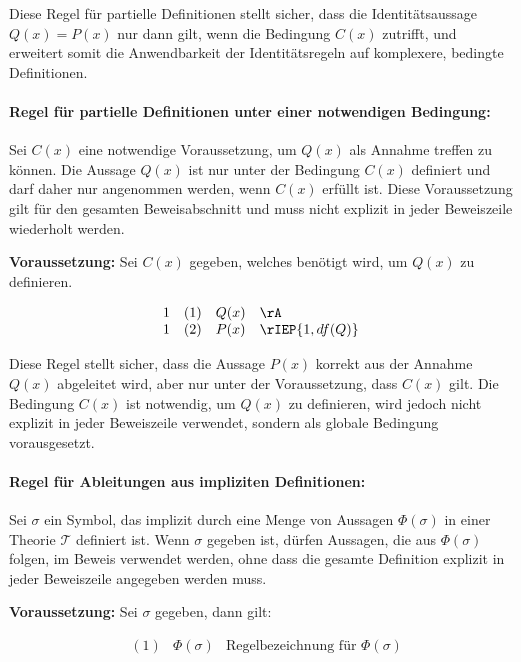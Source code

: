 \documentclass{book}
\theoremstyle{plain}
\theoremstyle{remark}
\theoremstyle{definition}
\begin{document}
Diese Regel für partielle Definitionen stellt sicher, dass die Identitätsaussage \(Q(x) = P(x)\) nur dann gilt, wenn die Bedingung \(C(x)\) zutrifft, und erweitert somit die Anwendbarkeit der Identitätsregeln auf komplexere, bedingte Definitionen.

\paragraph{Regel für partielle Definitionen unter einer notwendigen Bedingung:}
\label{rule:IEP}
Sei \(C(x)\) eine notwendige Voraussetzung, um \(Q(x)\) als Annahme treffen zu können. Die Aussage \(Q(x)\) ist nur unter der Bedingung \(C(x)\) definiert und darf daher nur angenommen werden, wenn \(C(x)\) erfüllt ist. Diese Voraussetzung gilt für den gesamten Beweisabschnitt und muss nicht explizit in jeder Beweiszeile wiederholt werden.

\vspace{0.5em}
\textbf{Voraussetzung:} Sei \(C(x)\) gegeben, welches benötigt wird, um \(Q(x)\) zu definieren.

\[
\begin{array}{llll}
	1 & (1) & Q(x) & \rA \\
	1 & (2) & P(x) & \rIEP{1,df(Q)} \\
\end{array}
\]

Diese Regel stellt sicher, dass die Aussage \(P(x)\) korrekt aus der Annahme \(Q(x)\) abgeleitet wird, aber nur unter der Voraussetzung, dass \(C(x)\) gilt. Die Bedingung \(C(x)\) ist notwendig, um \(Q(x)\) zu definieren, wird jedoch nicht explizit in jeder Beweiszeile verwendet, sondern als globale Bedingung vorausgesetzt.

\paragraph{Regel für Ableitungen aus impliziten Definitionen:}
\label{rule:ImpliziteDefinition}
Sei \(\sigma\) ein Symbol, das implizit durch eine Menge von Aussagen \(\Phi(\sigma)\) in einer Theorie \(\mathcal{T}\) definiert ist. Wenn \(\sigma\) gegeben ist, dürfen Aussagen, die aus \(\Phi(\sigma)\) folgen, im Beweis verwendet werden, ohne dass die gesamte Definition explizit in jeder Beweiszeile angegeben werden muss.

\vspace{0.5em}
\textbf{Voraussetzung:} Sei \(\sigma\) gegeben, dann gilt:

\[
\begin{array}{llll}
	  & (1) & \Phi(\sigma) & \text{Regelbezeichnung für } \Phi(\sigma) \\
\end{array}
\]
\end{document}
